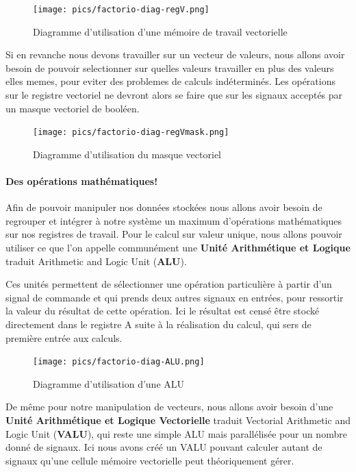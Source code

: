\documentclass{scrreprt}
\begin{document}
	\begin{figure}[h]
		\centering
		\texttt{[image: pics/factorio-diag-regV.png]}
		
		\caption{Diagramme d'utilisation d'une mémoire de travail vectorielle}
	\end{figure}
	
	Si en revanche nous devons travailler sur un vecteur de valeurs, nous allons avoir besoin de pouvoir selectionner sur quelles valeurs travailler en plus des valeurs elles memes, pour eviter des problemes de calculs indéterminés.
	Les opérations sur le registre vectoriel ne devront alors se faire que sur les signaux acceptés par un masque vectoriel de booléen.
	
	
	\begin{figure}[h]
		\centering
		\texttt{[image: pics/factorio-diag-regVmask.png]}
		
		\caption{Diagramme d'utilisation du masque vectoriel}
	\end{figure}
	
	\paragraph{Des opérations mathématiques!}
	Afin de pouvoir manipuler nos données stockées nous allons avoir besoin de regrouper et intégrer à notre système un maximum d'opérations mathématiques sur nos registres de travail.
	Pour le calcul sur valeur unique, nous allons pouvoir utiliser ce que l'on appelle communément une \textbf{Unité Arithmétique et Logique} traduit Arithmetic and Logic Unit (\textbf{ALU}).
	
	Ces unités permettent de sélectionner une opération particulière à partir d'un signal de commande et qui prends deux autres signaux en entrées, pour ressortir la valeur du résultat de cette opération.
	Ici le résultat est censé être stocké directement dans le registre A suite à la réalisation du calcul, qui sers de première entrée aux calculs.
	
	\begin{figure}[h]
		\centering
		\texttt{[image: pics/factorio-diag-ALU.png]}
		
		\caption{Diagramme d'utilisation d'une ALU}
	\end{figure}
	
	De même pour notre manipulation de vecteurs, nous allons avoir besoin d'une \textbf{Unité Arithmétique et Logique Vectorielle} traduit Vectorial Arithmetic and Logic Unit (\textbf{VALU}), qui reste une simple ALU mais parallélisée pour un nombre donné de signaux.
	Ici nous avons créé un VALU pouvant calculer autant de signaux qu'une cellule mémoire vectorielle peut théoriquement gérer. 
	
\end{document}
